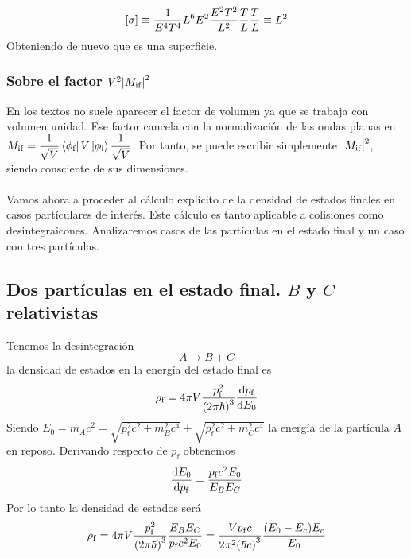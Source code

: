\begin{tcolorbox}[colback=applegreen!20, colframe=applegreen, title={Análisis dimensional: Sección eficaz del estado final}]
\begin{equation*}
        \qty[\sigma]\equiv \frac{1}{E^4T^4}L^6E^2 \frac{E^2T^2}{L^2} \frac{T}{L} \frac{T}{L}\equiv L^2 
\end{equation*}
Obteniendo de nuevo que es una superficie.
\end{tcolorbox}
\subsubsection{Sobre el factor $V^2\abs{M_\mathrm{if}}^2$}
En los textos no suele aparecer el factor de volumen ya que se trabaja con volumen unidad. Ese factor cancela con la normalización de las ondas planas en $M_\mathrm{if}=\dfrac{1}{\sqrt{V}} \bra{\phi_\text{f}}V\ket{\phi_\text{i}} \dfrac{1}{\sqrt{V}}$. Por tanto, se puede escribir simplemente $\abs{M_\mathrm{if}}^2$, siendo consciente de sus dimensiones.\\\\
Vamos ahora a proceder al cálculo explícito de la densidad de estados finales en casos partículares de interés. Este cálculo es tanto aplicable a colisiones como desintegraicones. Analizaremos casos de las partículas en el estado final y un caso con tres partículas.
\newpage
\subsection{Dos partículas en el estado final. $B$ y $C$ relativistas}
\noindent Tenemos la desintegración $$A\longrightarrow B+C$$ la densidad de estados en la energía del estado final es
\begin{equation}
    \rho_\mathrm{f}=4\pi V\frac{p_\mathrm{f}^2}{\qty(2\pi \hbar)^3} \dv{p_\mathrm{f}}{E_0}
\end{equation}
Siendo $E_0=m_Ac^2=\sqrt{p^2_\mathrm{f}c^2+m_B^2c^4}+\sqrt{p^2_\mathrm{f}c^2+m_C^2c^4}$ la energía de la partícula $A$ en reposo. Derivando respecto de $p_\mathrm{f}$ obtenemos$$\dv{E_0}{p_\mathrm{f}}=\frac{p_\mathrm{f}c^2E_0}{E_BE_C}$$
Por lo tanto la densidad de estados será
\begin{equation}
\rho_\mathrm{f}=4\pi V\frac{p_\mathrm{f}^2}{\qty(2\pi \hbar)^3} \frac{E_BE_C}{p_\mathrm{f}c^2E_0}=\frac{V p_\mathrm{f}c}{2\pi^2\qty(\hbar c)^3}  \frac{\qty(E_0-E_c)E_c}{E_0}
    \label{eq: densidad de estados final desintegracion relativista}
\end{equation}
